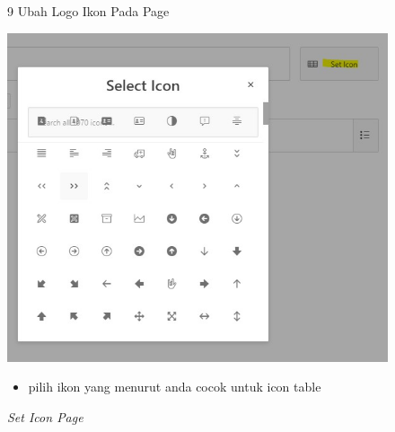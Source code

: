 \begin{itemize}
        \begin{figure}[!htbp]
        \item[9]Ubah Logo Ikon Pada Page
        \begin{center}
        \includegraphics[scale=0.5]{figures/set_icon_interractive.jpg}
        \caption{\textit{Set Icon Page}}
        \end{center}
        \begin{itemize}
            \item pilih ikon yang menurut anda cocok untuk icon table
        \end{itemize}
        \end{figure}
        

\end{itemize}
